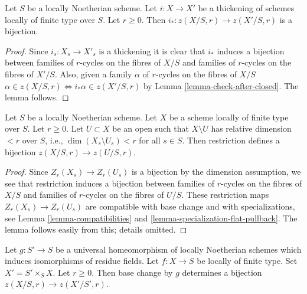 \begin{lemma}
\label{lemma-thickening}
Let $S$ be a locally Noetherian scheme. Let $i : X \to X'$ be a thickening
of schemes locally of finite type over $S$. Let $r \geq 0$.
Then $i_* : z(X/S, r) \to z(X'/S, r)$ is a bijection.
\end{lemma}

\begin{proof}
Since $i_s : X_s \to X'_s$ is a thickening it is clear that $i_*$ induces
a bijection between
families of $r$-cycles on the fibres of $X/S$ and
families of $r$-cycles on the fibres of $X'/S$.
Also, given a family $\alpha$ of $r$-cycles on the fibres of $X/S$
$\alpha \in z(X/S, r) \Leftrightarrow i_*\alpha \in z(X'/S, r)$
by Lemma \ref{lemma-check-after-closed}. The lemma follows.
\end{proof}

\begin{lemma}
\label{lemma-extend-to-larger}
Let $S$ be a locally Noetherian scheme. Let $X$ be a scheme locally
of finite type over $S$. Let $r \geq 0$. Let $U \subset X$ be an open
such that $X \setminus U$ has relative dimension $< r$ over $S$, i.e.,
$\dim(X_s \setminus U_s) < r$ for all $s \in S$. Then
restriction defines a bijection $z(X/S, r) \to z(U/S, r)$.
\end{lemma}

\begin{proof}
Since $Z_r(X_s) \to Z_r(U_s)$ is a bijection by the dimension assumption,
we see that restriction induces a bijection between
families of $r$-cycles on the fibres of $X/S$ and
families of $r$-cycles on the fibres of $U/S$.
These restriction maps $Z_r(X_s) \to Z_r(U_s)$ are
compatible with base change and with specializations, see
Lemma \ref{lemma-compatibilities} and \ref{lemma-specialization-flat-pullback}.
The lemma follows easily from this; details omitted.
\end{proof}

\begin{lemma}
\label{lemma-seminormalize-base}
Let $g : S' \to S$ be a universal homeomorphism of locally Noetherian schemes
which induces isomorphisms of residue fields. Let $f : X \to S$ be locally of
finite type. Set $X' = S' \times_S X$. Let $r \geq 0$. Then base change by $g$
determines a bijection $z(X/S, r) \to z(X'/S', r)$.
\end{lemma}

